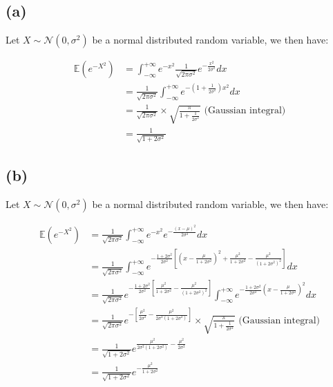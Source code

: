 \documentclass{article}
\begin{document}
\subsection*{(a)}

 Let  $X\sim \mathcal N(0,\sigma^2)$ be a normal distributed random variable, we then have:



\begin{align*}
\mathbb E(e^{-X^2})&=\displaystyle \int_{-\infty}^{+\infty} e^{-x^2}\frac{1}{\sqrt{2\pi\sigma^2}}e^{-\frac{x^2}{2\sigma^2}}dx\\
&=\displaystyle  \frac{1}{\sqrt{2\pi\sigma^2}}\int_{-\infty}^{+\infty} e^{-(1+\frac{1}{2\sigma^2})x^2}dx\\
&=\frac{1}{\sqrt{2\pi\sigma^2}}\times \sqrt{\frac{\pi}{1+\frac{1}{2\sigma^2}}} \text{ (Gaussian integral)}\\
&=\frac{1}{\sqrt{1+2\sigma^2}}
\end{align*}

\subsection*{(b)}

Let  $X\sim \mathcal N(0,\sigma^2)$ be a normal distributed random variable, we then have:



\begin{align*}
\mathbb E(e^{-X^2})&=\displaystyle \frac{1}{\sqrt{2\pi\sigma^2}} \int_{-\infty}^{+\infty} e^{-x^2}e^{-\frac{(x-\mu)^2}{2\sigma^2}}dx\\
&=\displaystyle \frac{1}{\sqrt{2\pi\sigma^2}} \int_{-\infty}^{+\infty} e^{  - \frac{1+2\sigma^2}{2\sigma^2} \left[  (x - \frac{\mu}{1+2\sigma^2})^2 + \frac{\mu^2}{1+2\sigma^2}-\frac{\mu^2}{(1+2\sigma^2)^2}      \right]  }dx\\
&= \displaystyle \frac{1}{\sqrt{2\pi\sigma^2}} e^{ - \frac{1+2\sigma^2}{2\sigma^2} \left[  \frac{\mu^2}{1+2\sigma^2}-\frac{\mu^2}{(1+2\sigma^2)^2}      \right] } \int_{-\infty}^{+\infty} e^{-\frac{1+2\sigma^2}{2\sigma^2}(x - \frac{\mu}{1+2\sigma^2})^2 }dx\\
&= \displaystyle \frac{1}{\sqrt{2\pi\sigma^2}} e^{ - \left[  \frac{\mu^2}{2\sigma^2}-\frac{\mu^2}{2\sigma^2(1+2\sigma^2)}      \right] }\times \sqrt{\frac{\pi}{1+\frac{1}{2\sigma^2}}} \text{ (Gaussian integral)}\\
&=\frac{1}{\sqrt{1+2\sigma^2}}e^{ \frac{\mu^2}{2\sigma^2(1+2\sigma^2)}-\frac{\mu^2}{2\sigma^2}       } \\
&=\frac{1}{\sqrt{1+2\sigma^2}}e^{-\frac{\mu^2}{1+2\sigma^2}}
\end{align*}
\end{document}
